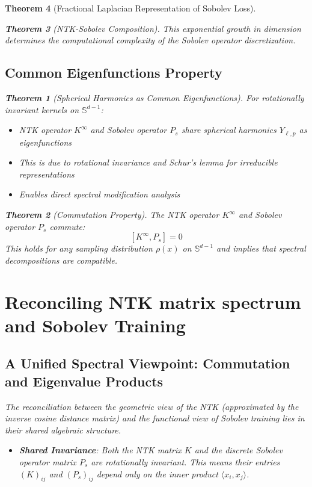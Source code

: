 \documentclass{article}
\newtheorem{theorem}{Theorem}[section]
\begin{document}
\begin{theorem}[Fractional Laplacian Representation of Sobolev Loss]
\begin{theorem}[NTK-Sobolev Composition]
This exponential growth in dimension determines the computational complexity of the Sobolev operator discretization.

\subsection{Common Eigenfunctions Property}

\begin{theorem}[Spherical Harmonics as Common Eigenfunctions]
For rotationally invariant kernels on $\mathbb{S}^{d-1}$:
\begin{itemize}
\item NTK operator $K^{\infty}$ and Sobolev operator $P_s$ share spherical harmonics $Y_{\ell,p}$ as eigenfunctions
\item This is due to rotational invariance and Schur's lemma for irreducible representations
\item Enables direct spectral modification analysis
\end{itemize}
\end{theorem}

\begin{theorem}[Commutation Property]
The NTK operator $K^{\infty}$ and Sobolev operator $P_s$ commute:
\[ [K^{\infty}, P_s] = 0 \]
This holds for any sampling distribution $\rho(x)$ on $\mathbb{S}^{d-1}$ and implies that spectral decompositions are compatible.
\end{theorem}


\newpage

\section{Reconciling NTK matrix spectrum and Sobolev Training}

\subsection{A Unified Spectral Viewpoint: Commutation and Eigenvalue Products}

The reconciliation between the geometric view of the NTK (approximated by the inverse cosine distance matrix) and the functional view of Sobolev training lies in their shared algebraic structure.

\begin{itemize}
    \item \textbf{Shared Invariance}: Both the NTK matrix $K$ and the discrete Sobolev operator matrix $P_s$ are rotationally invariant. This means their entries $(K)_{ij}$ and $(P_s)_{ij}$ depend only on the inner product $\langle x_i, x_j \rangle$.
    

\end{itemize}
\end{theorem}
\end{theorem}
\end{document}
